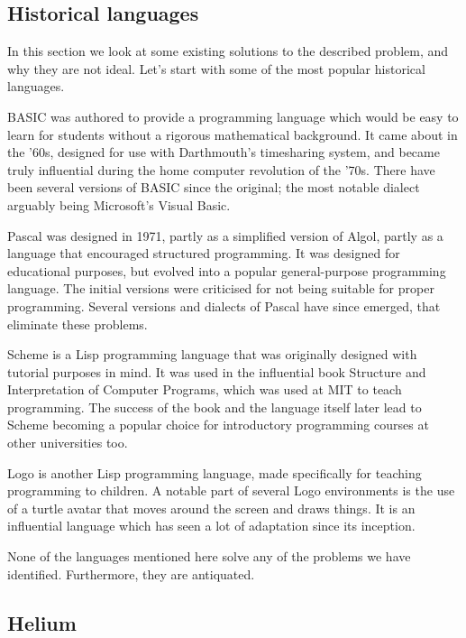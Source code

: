\subsection{Historical languages}
In this section we look at some existing solutions to the described problem, 
and why they are not ideal. Let's start with some of the most popular 
historical languages.

BASIC was authored to provide a programming language which would be easy to 
learn for students without a rigorous mathematical background. It came about 
in the '60s, designed for use with Darthmouth's timesharing system, and became 
truly influential during the home computer revolution of the '70s. There have 
been several versions of BASIC since the original; the most notable dialect 
arguably being Microsoft's Visual Basic\cite{time2014basic}.

Pascal was designed in 1971, partly as a simplified version of Algol, partly 
as a language that encouraged structured programming. It was designed for 
educational purposes, but evolved into a popular general-purpose programming 
language\cite{cantu2008essential}. The initial versions were criticised for 
not being suitable for proper programming\cite{kernighan1981pascal}. Several 
versions and dialects of Pascal have since emerged\cite{cantu2008essential}, 
that eliminate these problems.

Scheme is a Lisp programming language that was originally designed with 
tutorial purposes in mind\cite{sussman1998scheme}. It was used in the 
influential book Structure and Interpretation of Computer Programs, which was 
used at MIT to teach programming. The success of the book and the language 
itself later lead to Scheme becoming a popular choice for introductory 
programming courses at other universities too\cite{felleisen2004structure}.

Logo is another Lisp programming language, made specifically for teaching 
programming to children. A notable part of several Logo environments is the 
use of a turtle avatar that moves around the screen and draws things. It is an 
influential language which has seen a lot of adaptation since its 
inception\cite{logo2011whatislogo}.

None of the languages mentioned here solve any of the problems we have 
identified. Furthermore, they are antiquated.

\subsection{Helium}

